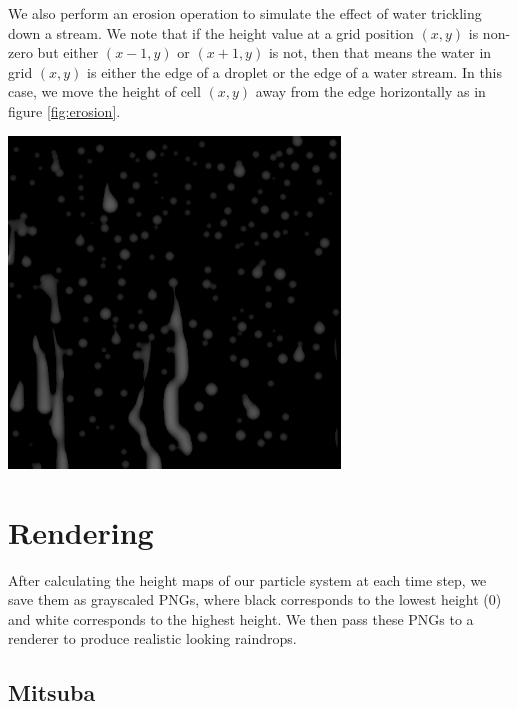 \documentclass[10pt,twocolumn,letterpaper]{article}
\newenvironment{Figure}
  {\par\medskip\noindent\minipage{\linewidth}}
  {\endminipage\par\medskip}
\begin{document}
We also perform an erosion operation to simulate the effect of water trickling down a stream. We note that if the height value at a grid position $(x,y)$ is non-zero but either $(x-1,y)$ or $(x+1,y)$ is not, then that means the water in grid $(x,y)$ is either the edge of a droplet or the edge of a water stream. In this case, we move the height of cell $(x, y)$ away from the edge horizontally as in figure \ref{fig:erosion}.

\begin{Figure}
    \centering
    \includegraphics[width=250pt]{heightmap3553.png}
    \label{fig:heightmap}
\end{Figure}


\section{Rendering}

After calculating the height maps of our particle system at each time step, we save them as grayscaled PNGs, where black corresponds to the lowest height (0) and white corresponds to the highest height. We then pass these PNGs to a renderer to produce realistic looking raindrops.

\subsection{Mitsuba}
\end{document}

